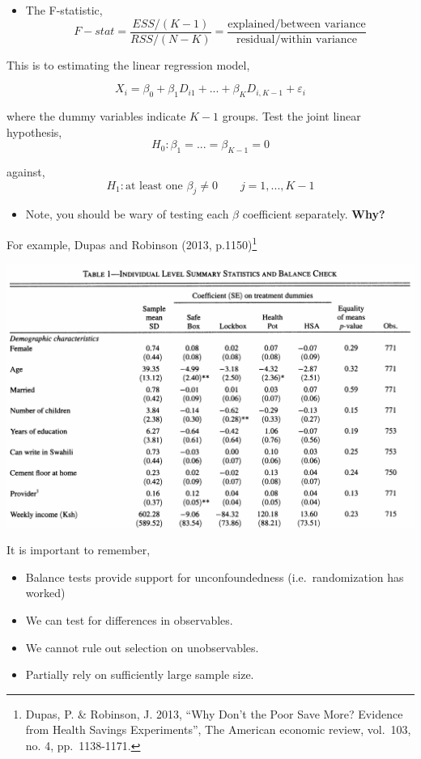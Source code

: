 \documentclass[
  letterpaper,
  DIV=11,
  numbers=noendperiod]{scrreprt}
\providecommand{\tightlist}{%
  \setlength{\itemsep}{0pt}\setlength{\parskip}{0pt}}\usepackage{longtable,booktabs,array}
\theoremstyle{definition}
\theoremstyle{remark}
\begin{document}
\begin{itemize}
\tightlist
\item
  The F-statistic, \[
              F-stat =\frac{ESS/(K-1)}{RSS/(N-K)} = \frac{\text{explained/between variance}}{\text{residual/within variance}}
  \]
\end{itemize}

This is to estimating the linear regression model,

\[
            X_i = \beta_0 + \beta_1D_{i1}+...+ \beta_KD_{i,K-1}+\varepsilon_i
\]

where the dummy variables indicate \(K-1\) groups. Test the joint linear
hypothesis, \[
            H_0: \beta_1 = ... = \beta_{K-1} = 0
\]

against, \[
            H_1: \text{at least one }\beta_j\neq0\qquad j=1,...,K-1
\]

\begin{itemize}
\tightlist
\item
  Note, you should be wary of testing each \(\beta\) coefficient
  separately. \textbf{Why?}
\end{itemize}

For example, Dupas and Robinson (2013, p.1150)\footnote{Dupas, P. \&
  Robinson, J. 2013, ``Why Don't the Poor Save More? Evidence from
  Health Savings Experiments'', The American economic review, vol.~103,
  no. 4, pp.~1138-1171.}

\includegraphics{Images/Dupas_Baseline_1.png}

It is important to remember,

\par

\begin{itemize}
\tightlist
\item
  Balance tests provide support for unconfoundedness (i.e.~randomization
  has worked)
\item
  We can test for differences in observables.
\item
  We cannot rule out selection on unobservables.
\item
  Partially rely on sufficiently large sample size.
\end{itemize}
\end{document}
